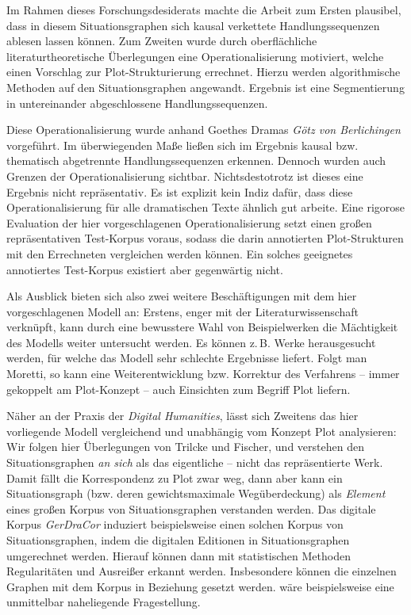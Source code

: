 \documentclass[a4paper,10pt,abstract=true,headings=small]{scrartcl}
\newcommand{\eng}[1]{\textenglish{\emph{#1}}}
\begin{document}
Im Rahmen dieses Forschungsdesiderats machte die Arbeit zum Ersten plausibel, dass in diesem Situationsgraphen sich kausal verkettete Handlungssequenzen ablesen lassen können.
Zum Zweiten wurde durch oberflächliche literaturtheoretische Überlegungen eine Operationalisierung motiviert, welche einen Vorschlag zur Plot-Strukturierung errechnet.
Hierzu werden algorithmische Methoden auf den Situationsgraphen angewandt.
Ergebnis ist eine Segmentierung in untereinander abgeschlossene Handlungssequenzen.

Diese Operationalisierung wurde anhand Goethes Dramas \emph{Götz von Berlichingen} vorgeführt. Im überwiegenden Maße ließen sich im Ergebnis kausal bzw. thematisch abgetrennte Handlungssequenzen erkennen.
Dennoch wurden  auch Grenzen der Operationalisierung sichtbar.
Nichtsdestotrotz ist dieses eine  Ergebnis nicht repräsentativ.
Es ist explizit kein Indiz dafür, dass diese Operationalisierung für alle dramatischen Texte ähnlich gut arbeite.
Eine rigorose Evaluation der hier vorgeschlagenen Operationalisierung setzt einen großen repräsentativen Test-Korpus voraus,
sodass die darin annotierten  Plot-Strukturen mit den Errechneten vergleichen werden können.\autocite[Vgl.][608]{jannidis_computergestuetzte_2017}
Ein solches geeignetes annotiertes Test-Korpus existiert aber gegenwärtig nicht.

Als Ausblick bieten sich also zwei weitere Beschäftigungen mit dem hier vorgeschlagenen Modell an:
Erstens, enger mit der  Literaturwissenschaft verknüpft, kann durch eine bewusstere Wahl von Beispielwerken die Mächtigkeit des Modells weiter untersucht werden.
Es können z.\,B. Werke herausgesucht werden, für welche das Modell sehr schlechte Ergebnisse liefert.
Folgt man Moretti, so kann eine Weiterentwicklung bzw. Korrektur des Verfahrens – immer gekoppelt am Plot-Konzept – auch Einsichten zum Begriff Plot liefern.\autocites[Vgl.][13]{moretti_operationalizing:_2013}[Vgl.][]{trilcke_small_2020}

Näher an der Praxis der \eng{Digital Humanities}, lässt sich Zweitens das hier vorliegende Modell vergleichend und unabhängig vom Konzept Plot analysieren: %
Wir folgen hier Überlegungen von Trilcke und Fischer, und verstehen den Situationsgraphen \emph{an sich} als das eigentliche  – nicht das repräsentierte Werk.
Damit fällt die Korrespondenz zu Plot zwar weg, dann aber kann ein Situationsgraph (bzw. deren gewichtsmaximale Wegüberdeckung) als \emph{Element} eines großen Korpus von Situationsgraphen verstanden werden.\autocite[Vgl.][]{trilcke_literaturwissenschaft_2018}
Das digitale Korpus \emph{GerDraCor} induziert beispielsweise einen solchen Korpus von Situationsgraphen, indem die digitalen Editionen in Situationsgraphen umgerechnet werden.
Hierauf können dann mit statistischen Methoden Regularitäten und Ausreißer erkannt werden.
Insbesondere können die einzelnen Graphen mit dem Korpus in Beziehung gesetzt werden.
 wäre beispielsweise eine unmittelbar naheliegende Fragestellung.


\printbibliography\clearpage
\end{document}
